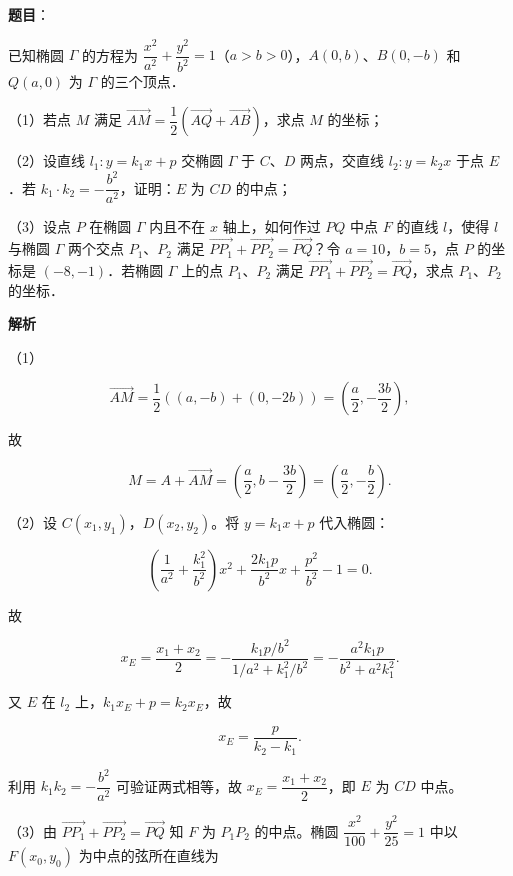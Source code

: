 \begin{answer}

\textbf{题目}：

已知椭圆 $\Gamma$ 的方程为 $\dfrac{x^2}{a^2}+\dfrac{y^2}{b^2}=1$（$a>b>0$），$A(0,b)$、$B(0,-b)$ 和 $Q(a,0)$ 为 $\Gamma$ 的三个顶点．

（1）若点 $M$ 满足 $\overrightarrow{AM}=\dfrac12\left(\overrightarrow{AQ}+\overrightarrow{AB}\right)$，求点 $M$ 的坐标；

（2）设直线 $l_1:y=k_1x+p$ 交椭圆 $\Gamma$ 于 $C$、$D$ 两点，交直线 $l_2:y=k_2x$ 于点 $E$．若 $k_1\cdot k_2=-\dfrac{b^2}{a^2}$，证明：$E$ 为 $CD$ 的中点；

（3）设点 $P$ 在椭圆 $\Gamma$ 内且不在 $x$ 轴上，如何作过 $PQ$ 中点 $F$ 的直线 $l$，使得 $l$ 与椭圆 $\Gamma$ 两个交点 $P_1$、$P_2$ 满足 $\overrightarrow{PP_1}+\overrightarrow{PP_2}=\overrightarrow{PQ}$？令 $a=10$，$b=5$，点 $P$ 的坐标是 $(-8,-1)$．若椭圆 $\Gamma$ 上的点 $P_1$、$P_2$ 满足 $\overrightarrow{PP_1}+\overrightarrow{PP_2}=\overrightarrow{PQ}$，求点 $P_1$、$P_2$ 的坐标．

\textbf{解析}

（1）

\nopagebreak[4]
\[\overrightarrow{AM}=\frac12\left((a,-b)+(0,-2b)\right)
=\left(\frac a2,-\frac{3b}2\right),\]

故

\nopagebreak[4]
\[M=A+\overrightarrow{AM}=\left(\frac a2,b-\frac{3b}2\right)
=\left(\frac a2,-\frac b2\right).\]

（2）设 $C(x_1,y_1)$，$D(x_2,y_2)$。将 $y=k_1x+p$ 代入椭圆：

\nopagebreak[4]
\[\left(\frac1{a^2}+\frac{k_1^2}{b^2}\right)x^2
+\frac{2k_1p}{b^2}x+\frac{p^2}{b^2}-1=0.\]

故

\nopagebreak[4]
\[x_E=\frac{x_1+x_2}{2}
=-\frac{k_1p/b^2}{1/a^2+k_1^2/b^2}
=-\frac{a^2k_1p}{b^2+a^2k_1^2}.\]

又 $E$ 在 $l_2$ 上，$k_1x_E+p=k_2x_E$，故

\nopagebreak[4]
\[x_E=\frac{p}{k_2-k_1}.\]

利用 $k_1k_2=-\dfrac{b^2}{a^2}$ 可验证两式相等，故 $x_E=\dfrac{x_1+x_2}2$，即 $E$ 为 $CD$ 中点。

（3）由 $\overrightarrow{PP_1}+\overrightarrow{PP_2}=\overrightarrow{PQ}$ 知 $F$ 为 $P_1P_2$ 的中点。椭圆 $\dfrac{x^2}{100}+\dfrac{y^2}{25}=1$ 中以 $F(x_0,y_0)$ 为中点的弦所在直线为


\end{answer}
